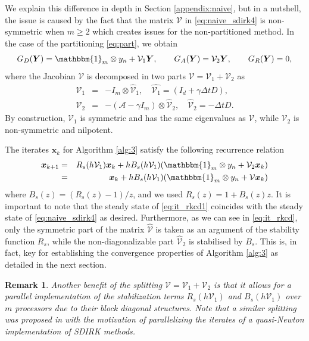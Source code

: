 \documentclass[10pt,a4paper]{article}
\newtheorem{remark}[theorem]{Remark}
\begin{document}
We  explain this difference in depth in Section \ref{appendix:naive}, but in a nutshell, the issue is caused by the fact that the matrix $\mathcal{V}$ in \eqref{eq:naive_sdirk4}  is non-symmetric when $m \geq 2$  which creates issues for the non-partitioned method.  In the case of the partitioning \eqref{eq:part}, 
we obtain
\[
G_{D}(\boldsymbol{Y})=\mathbbm{1}_m \otimes y_n +\mathcal{V}_{1}\boldsymbol{Y},\qquad G_{A}(\boldsymbol{Y})=\mathcal{V}_{2}\boldsymbol{Y},\qquad
G_{R}(\boldsymbol{Y}) =0,
\]
where  the Jacobian $\mathcal{V}$ is decomposed in two parts $\mathcal{V}=\mathcal{V}_{1}+\mathcal{V}_{2}$ as
\begin{eqnarray*}
    \mathcal{V}_{1} &=& -I_{m}\otimes \hat{\mathcal{V}}_{1}, \quad \hat{\mathcal{V}_{1}}= (I_{d}+\gamma \Delta t D), \\
    \mathcal{V}_{2} &=&-\left(\mathcal{A}-\gamma I_{m} \right)\otimes \hat{\mathcal{V}}_{2}, \quad \hat{\mathcal{V}}_{2}=-\Delta t D.
\end{eqnarray*}
By construction, $\mathcal{V}_{1}$ is symmetric and has the same eigenvalues as $\mathcal{V}$, while $\mathcal{V}_{2}$ is non-symmetric and nilpotent. 

The iterates $\boldsymbol{x}_{k}$ for Algorithm \ref{alg:3} satisfy the following recurrence relation
\begin{eqnarray} 
    \boldsymbol{x}_{k+1}
   & = &
    R_s(h \mathcal{V}_{1})
    \boldsymbol{x}_k
   +
   hB_s(h \mathcal{V}_1)
   (\mathbbm{1}_m \otimes y_n +
	\mathcal{V}_2 \boldsymbol{x}_k) \label{eq:it_rkcd} \nonumber \\
&=&
    \boldsymbol{x}_k+ h B_s(h \mathcal{V}_{1})
   ( \mathbbm{1}_m \otimes y_n +
	\mathcal{V}\boldsymbol{x}_{k}) 
    \label{eq:it_rkcd1}
\end{eqnarray}
where $B_s(z)=(R_s(z)-1)/z$, and we used $R_s(z)=1+B_s(z)z$. It is important to note that the steady state of \eqref{eq:it_rkcd1} coincides with the steady state of \eqref{eq:naive_sdirk4} as desired. Furthermore, as we can see in \eqref{eq:it_rkcd}, only the symmetric part of the matrix {$\hat{\mathcal{V}}$} is taken as an argument of the stability function $R_{s}$, while the non-diagonalizable part {$\hat{\mathcal{V}}_2$} is stabilised by $B_s$. This is, in fact, key for establishing the convergence properties of Algorithm \ref{alg:3} as detailed in the next section. 
\begin{remark}
Another benefit of the splitting $\mathcal{V}=\mathcal{V}_1+\mathcal{V}_2$ is that it allows for a parallel implementation of the stabilization terms $ R_s(h \mathcal{V}_{1})$ and $B_s(h \mathcal{V}_{1})$ over $m$ processors due to their block diagonal structures. Note that a similar splitting was proposed in \cite{VSC92} with the motivation of parallelizing the  iterates of a quasi-Newton implementation of SDIRK methods.
\end{remark}
\end{document}

